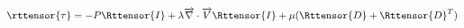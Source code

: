 \begin{equation}
\rttensor{\tau} = -P\Rttensor{I} + \lambda\overrightarrow{\nabla}\cdot\overrightarrow{V}\Rttensor{I}  + \mu ( \Rttensor{D} + \Rttensor{D}^T )
\end{equation}


